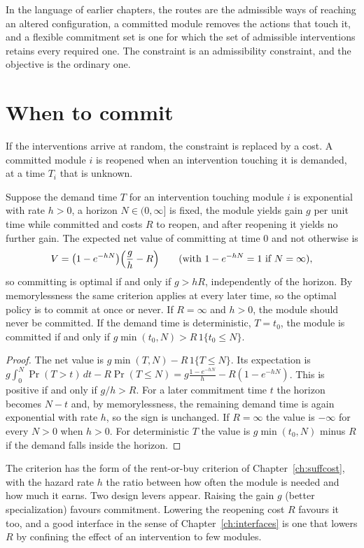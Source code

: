 In the language of earlier chapters, the routes are the admissible ways of reaching an altered configuration, a committed module removes the actions that touch it, and a flexible commitment set is one for which the set of admissible interventions retains every required one. The constraint is an admissibility constraint, and the objective is the ordinary one.

\section{When to commit}

If the interventions arrive at random, the constraint is replaced by a cost. A committed module $i$ is reopened when an intervention touching it is demanded, at a time $T_i$ that is unknown.

\begin{newresult}\label{thm:commit}
Suppose the demand time $T$ for an intervention touching module $i$ is exponential with rate $h>0$, a horizon $N\in(0,\infty]$ is fixed, the module yields gain $g$ per unit time while committed and costs $R$ to reopen, and after reopening it yields no further gain. The expected net value of committing at time $0$ and not otherwise is
\[
V=\bigl(1-e^{-hN}\bigr)\Bigl(\frac gh-R\Bigr)\qquad(\text{with }1-e^{-hN}=1\text{ if }N=\infty),
\]
so committing is optimal if and only if $g>hR$, independently of the horizon. By memorylessness the same criterion applies at every later time, so the optimal policy is to commit at once or never. If $R=\infty$ and $h>0$, the module should never be committed. If the demand time is deterministic, $T=t_0$, the module is committed if and only if $g\min(t_0,N)>R\,1\{t_0\le N\}$.
\end{newresult}
\begin{proof}
The net value is $g\min(T,N)-R\,1\{T\le N\}$. Its expectation is $g\int_0^N\Pr(T>t)\,dt-R\Pr(T\le N)=g\frac{1-e^{-hN}}{h}-R(1-e^{-hN})$. This is positive if and only if $g/h>R$. For a later commitment time $t$ the horizon becomes $N-t$ and, by memorylessness, the remaining demand time is again exponential with rate $h$, so the sign is unchanged. If $R=\infty$ the value is $-\infty$ for every $N>0$ when $h>0$. For deterministic $T$ the value is $g\min(t_0,N)$ minus $R$ if the demand falls inside the horizon.
\end{proof}

The criterion has the form of the rent-or-buy criterion of Chapter~\ref{ch:suffcost}, with the hazard rate $h$ the ratio between how often the module is needed and how much it earns. Two design levers appear. Raising the gain $g$ (better specialization) favours commitment. Lowering the reopening cost $R$ favours it too, and a good interface in the sense of Chapter~\ref{ch:interfaces} is one that lowers $R$ by confining the effect of an intervention to few modules.

